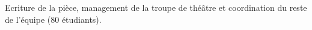 \documentclass[]{cv-template}
\begin{document}
\begin{minipage}[t]{0.65\textwidth}
Ecriture de la pièce, management de la troupe de théâtre et coordination du reste de l'équipe (80 étudiants).



\sectionsep

\end{minipage}
\end{document}
